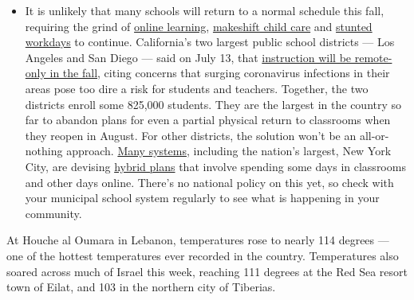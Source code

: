 \begin{itemize}
  \begin{itemize}
  \tightlist
  \item
    It is unlikely that many schools will return to a normal schedule
    this fall, requiring the grind of
    \href{https://www.nytimes3xbfgragh.onion/2020/06/05/us/coronavirus-education-lost-learning.html?action=click\&pgtype=Article\&state=default\&region=MAIN_CONTENT_3\&context=storylines_faq}{online
    learning},
    \href{https://www.nytimes3xbfgragh.onion/2020/05/29/us/coronavirus-child-care-centers.html?action=click\&pgtype=Article\&state=default\&region=MAIN_CONTENT_3\&context=storylines_faq}{makeshift
    child care} and
    \href{https://www.nytimes3xbfgragh.onion/2020/06/03/business/economy/coronavirus-working-women.html?action=click\&pgtype=Article\&state=default\&region=MAIN_CONTENT_3\&context=storylines_faq}{stunted
    workdays} to continue. California's two largest public school
    districts --- Los Angeles and San Diego --- said on July 13, that
    \href{https://www.nytimes3xbfgragh.onion/2020/07/13/us/lausd-san-diego-school-reopening.html?action=click\&pgtype=Article\&state=default\&region=MAIN_CONTENT_3\&context=storylines_faq}{instruction
    will be remote-only in the fall}, citing concerns that surging
    coronavirus infections in their areas pose too dire a risk for
    students and teachers. Together, the two districts enroll some
    825,000 students. They are the largest in the country so far to
    abandon plans for even a partial physical return to classrooms when
    they reopen in August. For other districts, the solution won't be an
    all-or-nothing approach.
    \href{https://bioethics.jhu.edu/research-and-outreach/projects/eschool-initiative/school-policy-tracker/}{Many
    systems}, including the nation's largest, New York City, are
    devising
    \href{https://www.nytimes3xbfgragh.onion/2020/06/26/us/coronavirus-schools-reopen-fall.html?action=click\&pgtype=Article\&state=default\&region=MAIN_CONTENT_3\&context=storylines_faq}{hybrid
    plans} that involve spending some days in classrooms and other days
    online. There's no national policy on this yet, so check with your
    municipal school system regularly to see what is happening in your
    community.
  \end{itemize}
\end{itemize}

At Houche al Oumara in Lebanon, temperatures rose to nearly 114 degrees
--- one of the hottest temperatures ever recorded in the country.
Temperatures also soared across much of Israel this week, reaching 111
degrees at the Red Sea resort town of Eilat, and 103 in the northern
city of Tiberias.

